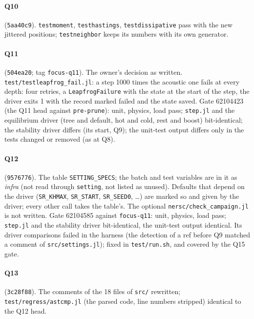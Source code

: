 \documentclass[11pt,aps,preprint,nofootinbib,superscriptaddress,tightenlines]{revtex4-2}
\let\oldparagraph\paragraph
\renewcommand{\paragraph}{\par\bigskip\oldparagraph}
\begin{document}
\paragraph{Q10} (\texttt{5aa40c9}).  \texttt{testmoment}, \texttt{testhastings}, \texttt{testdissipative} pass with the new jittered
positions; \texttt{testneighbor} keeps its numbers with its own generator.

\paragraph{Q11} (\texttt{504ea20}; tag \texttt{focus-q11}).  The owner's decision as written.  \nolinkurl{test/testleapfrog_fail.jl}: a
step 1000 times the acoustic one fails at every depth: four retries, a \texttt{LeapfrogFailure} with the state at the start of the
step, the driver exits 1 with the record marked failed and the state saved.  Gate 62104423 (the Q11 head against \texttt{pre-prune}): unit,
physics, load pass; \texttt{step.jl} and the equilibrium driver (tree and default, hot and cold, rest and boost) bit-identical; the
stability driver differs (its start, Q9); the unit-test output differs only in the tests changed or removed (as at Q8).

\paragraph{Q12} (\texttt{9576776}).  The table \texttt{SETTING\_SPECS}; the batch and test variables are in it as \emph{infra} (not read
through \texttt{setting}, not listed as unused).  Defaults that depend on the driver (\texttt{SR\_KHMAX}, \texttt{SR\_START},
\texttt{SR\_SEED0}, \ldots) are marked so and given by the driver; every other call takes the table's.  The optional
\nolinkurl{nersc/check_campaign.jl} is not written.  Gate 62104585 against \texttt{focus-q11}: unit, physics, load pass; \texttt{step.jl} and the stability
driver bit-identical, the unit-test output identical.  Its driver comparisons failed in the harness (the detection of a ref before Q9
matched a comment of \nolinkurl{src/settings.jl}); fixed in \nolinkurl{test/run.sh}, and covered by the Q15 gate.

\paragraph{Q13} (\texttt{3c28f88}).  The comments of the 18 files of \nolinkurl{src/} rewritten; \nolinkurl{test/regress/astcmp.jl}
(the parsed code, line numbers stripped) identical to the Q12 head.
\end{document}
